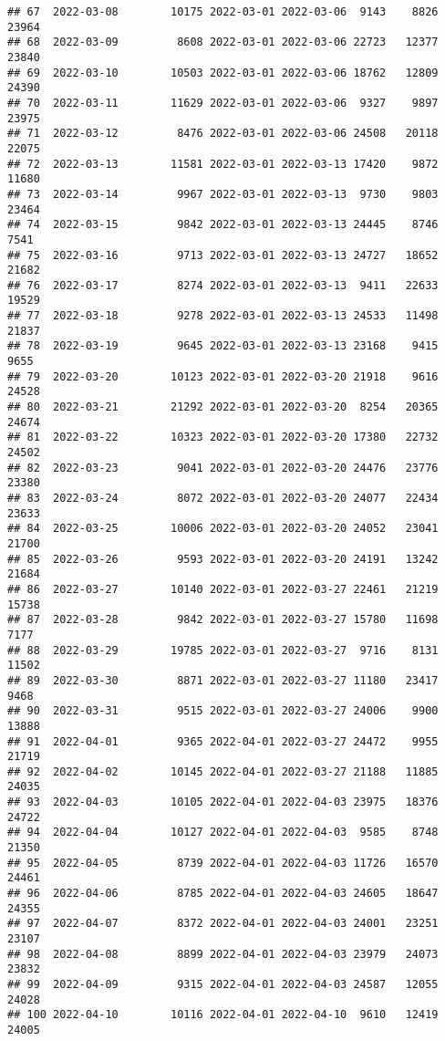 \documentclass[
]{article}
\begin{document}
\begin{verbatim}
## 67  2022-03-08        10175 2022-03-01 2022-03-06  9143    8826      23964
## 68  2022-03-09         8608 2022-03-01 2022-03-06 22723   12377      23840
## 69  2022-03-10        10503 2022-03-01 2022-03-06 18762   12809      24390
## 70  2022-03-11        11629 2022-03-01 2022-03-06  9327    9897      23975
## 71  2022-03-12         8476 2022-03-01 2022-03-06 24508   20118      22075
## 72  2022-03-13        11581 2022-03-01 2022-03-13 17420    9872      11680
## 73  2022-03-14         9967 2022-03-01 2022-03-13  9730    9803      23464
## 74  2022-03-15         9842 2022-03-01 2022-03-13 24445    8746       7541
## 75  2022-03-16         9713 2022-03-01 2022-03-13 24727   18652      21682
## 76  2022-03-17         8274 2022-03-01 2022-03-13  9411   22633      19529
## 77  2022-03-18         9278 2022-03-01 2022-03-13 24533   11498      21837
## 78  2022-03-19         9645 2022-03-01 2022-03-13 23168    9415       9655
## 79  2022-03-20        10123 2022-03-01 2022-03-20 21918    9616      24528
## 80  2022-03-21        21292 2022-03-01 2022-03-20  8254   20365      24674
## 81  2022-03-22        10323 2022-03-01 2022-03-20 17380   22732      24502
## 82  2022-03-23         9041 2022-03-01 2022-03-20 24476   23776      23380
## 83  2022-03-24         8072 2022-03-01 2022-03-20 24077   22434      23633
## 84  2022-03-25        10006 2022-03-01 2022-03-20 24052   23041      21700
## 85  2022-03-26         9593 2022-03-01 2022-03-20 24191   13242      21684
## 86  2022-03-27        10140 2022-03-01 2022-03-27 22461   21219      15738
## 87  2022-03-28         9842 2022-03-01 2022-03-27 15780   11698       7177
## 88  2022-03-29        19785 2022-03-01 2022-03-27  9716    8131      11502
## 89  2022-03-30         8871 2022-03-01 2022-03-27 11180   23417       9468
## 90  2022-03-31         9515 2022-03-01 2022-03-27 24006    9900      13888
## 91  2022-04-01         9365 2022-04-01 2022-03-27 24472    9955      21719
## 92  2022-04-02        10145 2022-04-01 2022-03-27 21188   11885      24035
## 93  2022-04-03        10105 2022-04-01 2022-04-03 23975   18376      24722
## 94  2022-04-04        10127 2022-04-01 2022-04-03  9585    8748      21350
## 95  2022-04-05         8739 2022-04-01 2022-04-03 11726   16570      24461
## 96  2022-04-06         8785 2022-04-01 2022-04-03 24605   18647      24355
## 97  2022-04-07         8372 2022-04-01 2022-04-03 24001   23251      23107
## 98  2022-04-08         8899 2022-04-01 2022-04-03 23979   24073      23832
## 99  2022-04-09         9315 2022-04-01 2022-04-03 24587   12055      24028
## 100 2022-04-10        10116 2022-04-01 2022-04-10  9610   12419      24005

\end{verbatim}
\end{document}
